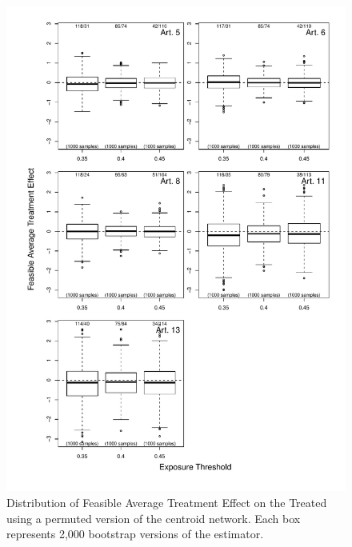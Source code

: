 \documentclass[10pt]{article}
\begin{document}
\begin{figure}[H]
	\centering
	\includegraphics[width=.8\linewidth]{../fig/matching_bloxplot_dummy.pdf}
	\caption{Distribution of Feasible Average Treatment Effect on the Treated using a permuted version of the centroid network. Each box represents 2,000 bootstrap versions of the estimator.}
\end{figure}


\end{document}
